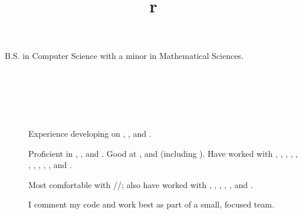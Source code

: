 \begin{resume}


\section{}

B.S. in Computer Science with a minor in Mathematical Sciences.


\begin{formatb}
  \title{r}\\
  \\
  \body\\
\end{formatb}


\section{}
\begin{description}
\item[]
Experience developing on , ,  and .
\item[]
Proficient in , ,  and \kw{\Cplusplus}.
Good at ,  and  (including
).
Have worked with \kw{\LaTeX}, , ,
\kw{\CSharp}, , , , , ,
,  and .

\item[]
Most comfortable with //;
also have worked with , , ,
, ,  and .

\item[]
I comment my code and work best as part of a small, focused team.

\end{description}

\section{}


\end{resume}

